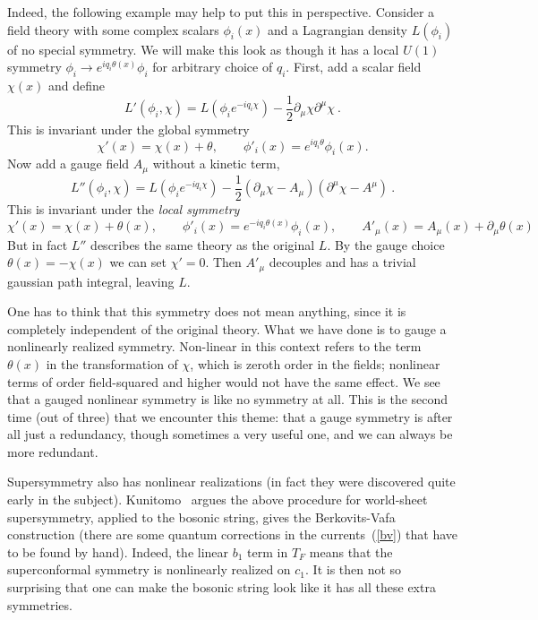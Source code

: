 Indeed,
the following example may help to put this in perspective.  Consider
a field theory with some complex scalars $\phi_i(x)$ and a Lagrangian
density $L(\phi_i)$ of no special symmetry.  We will make this look as
though it has a local $U(1)$ symmetry $\phi_i \to e^{i q_i \theta(x)}
\phi_i$ for arbitrary choice of $q_i$.  First, add a scalar field
$\chi(x)$ and define
\begin{equation}
L'(\phi_i,\chi) = L(\phi_i e^{-iq_i\chi}) - \frac{1}{2} \partial_\mu
\chi \partial^\mu \chi\ .
\end{equation}
This is invariant under the global symmetry
\begin{equation}
\chi'(x) = \chi(x) + \theta, \qquad \phi'_i(x) = e^{i q_i \theta}
\phi_i(x).
\end{equation}
Now add a gauge field $A_\mu$ without a kinetic term,
\begin{equation}
L''(\phi_i,\chi) = L(\phi_i e^{-iq_i\chi}) - \frac{1}{2}
(\partial_\mu \chi - A_\mu) (\partial^\mu \chi - A^\mu)\ .
\end{equation}
This is invariant under the {\it local symmetry}
\begin{equation}
\chi'(x) = \chi(x) + \theta(x), \qquad \phi'_i(x) = e^{-i q_i
\theta(x)} \phi_i(x), \qquad A'_\mu(x) = A_\mu(x) + \partial_\mu
\theta(x)
\end{equation}
But in fact $L''$ describes the same theory as the original $L$.
By the gauge choice $\theta(x) = - \chi(x)$ we can set $\chi' = 0$.
Then $A'_\mu$ decouples and has a trivial gaussian path integral,
leaving $L$. 

One has to think that this symmetry does not mean anything, since it
is completely independent of the original theory.  What we have done
is to gauge a nonlinearly realized symmetry.  Non-linear in this
context refers to the term $\theta(x)$ in the transformation of
$\chi$, which is zeroth order in the fields; nonlinear terms of order 
field-squared and higher would not have the same effect.
We see that a gauged nonlinear symmetry is like no symmetry at all.
This is the second time (out of three) that we encounter this theme:
that a gauge symmetry is after all just a redundancy, though
sometimes a very useful one, and we can always be more redundant. 

Supersymmetry also has nonlinear realizations (in fact they were
discovered quite early in the subject).  Kunitomo~\cite{Knlr} argues
the above procedure for world-sheet supersymmetry, applied to the
bosonic string, gives the Berkovits-Vafa construction (there are
some quantum corrections in the currents~(\ref{bv}) that have to be
found by hand).  Indeed, the linear $b_1$ term in $T_F$ means that
the superconformal symmetry is nonlinearly realized on $c_1$. 
It is then not so surprising that one can make the bosonic string look
like it has all these extra symmetries.

